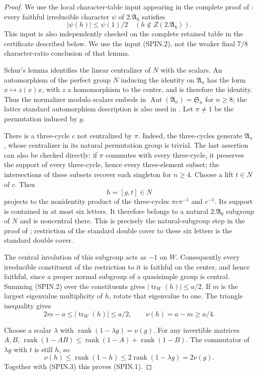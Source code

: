 \begin{proof}
We use the local character-table input appearing in the complete
proof of \cite[Lemma~2.23, pp.~621--622]{HD:GT2012}: every faithful
irreducible character $\psi$ of $2.\mathfrak A_6$ satisfies
\[
       |\psi(h)|\le\psi(1)/2\quad
       (h\notin Z(2.\mathfrak A_6)).                       \tag{SPIN.2}
\]
This input is also independently checked on the complete retained
table in the certificate described below.  We use the input (SPIN.2),
not the weaker final $7/8$ character-ratio conclusion of that lemma.

Schur's lemma identifies the linear centralizer of $N$ with the
scalars.  An automorphism of the perfect group $N$ inducing the
identity on $\mathfrak A_n$ has the form $x\mapsto z(x)x$, with
$z$ a homomorphism to the center, and is therefore the identity.
Thus the normalizer modulo scalars embeds in
$\operatorname{Aut}(\mathfrak A_n)=\mathfrak S_n$ for $n\ge8$;
the latter standard automorphism description is also used in
\cite[proof of Proposition~3.4, p.~626]{HD:GT2012}.
Let $\pi\ne1$ be the permutation induced by $g$.

There is a three-cycle $c$ not centralized by $\pi$.  Indeed, the
three-cycles generate $\mathfrak A_n$, whose centralizer in its
natural permutation group is trivial.  The last assertion can
also be checked directly: if $\pi$ commutes with every three-cycle,
it preserves the support of every three-cycle, hence every
three-element subset; the intersections of these subsets recover
each singleton for $n\ge4$.  Choose a lift $t\in N$ of $c$.
Then
\[
                   h=[g,t]\in N
\]
projects to the nonidentity product of the three-cycles
$\pi c\pi^{-1}$ and $c^{-1}$.  Its support is contained in at
most six letters.  It therefore belongs to a natural
$2.\mathfrak A_6$ subgroup of $N$ and is noncentral there.
This is precisely the natural-subgroup step in the proof of
\cite[Lemma~2.23]{HD:GT2012}; restriction of the standard double
cover to these six letters is the standard double cover.

The central involution of this subgroup acts as $-1$ on $W$.
Consequently every irreducible constituent of the restriction
to it is faithful on the center, and hence faithful, since a
proper normal subgroup of a quasisimple group is central.
Summing (SPIN.2) over the constituents gives
$|\operatorname{tr}_W(h)|\le a/2$.  If $m$ is the largest
eigenvalue multiplicity of $h$, rotate that eigenvalue to one.
The triangle inequality gives
\[
           2m-a\le|\operatorname{tr}_W(h)|\le a/2,
           \qquad \nu(h)=a-m\ge a/4.                     \tag{SPIN.3}
\]

Choose a scalar $\lambda$ with
$\operatorname{rank}(1-\lambda g)=\nu(g)$.
For any invertible matrices $A,B$,
$\operatorname{rank}(1-AB)\le
\operatorname{rank}(1-A)+\operatorname{rank}(1-B)$.
The commutator of $\lambda g$ with $t$ is still $h$, so
\[
 \nu(h)\le\operatorname{rank}(1-h)
 \le 2\operatorname{rank}(1-\lambda g)=2\nu(g).
\]
Together with (SPIN.3) this proves (SPIN.1).
\end{proof}

